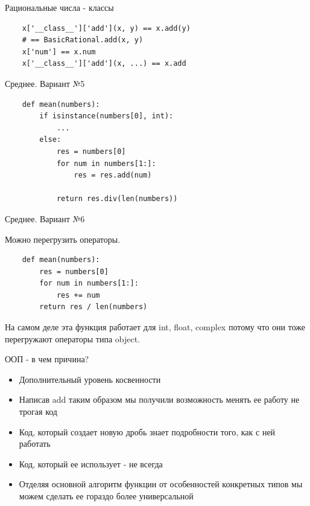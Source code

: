 \documentclass{article}
\begin{document}
\begin{center} Рациональные числа - классы \end{center}
\begin{lstlisting}
    x['__class__']['add'](x, y) == x.add(y) 
    # == BasicRational.add(x, y)
    x['num'] == x.num
    x['__class__']['add'](x, ...) == x.add
\end{lstlisting}
\newpage

\begin{center} Среднее. Вариант №5 \end{center}
\begin{lstlisting}
    def mean(numbers):
        if isinstance(numbers[0], int):
            ...
        else:
            res = numbers[0]
            for num in numbers[1:]:
                res = res.add(num)

            return res.div(len(numbers))
\end{lstlisting}
\newpage

\begin{center} Среднее. Вариант №6 \end{center}
Можно перегрузить операторы.
\begin{lstlisting}
    def mean(numbers):
        res = numbers[0]
        for num in numbers[1:]:
            res += num
        return res / len(numbers)
\end{lstlisting}
На самом деле эта функция работает для int, float, complex потому что
они тоже перегружают операторы типа object.
\newpage

\begin{center} ООП - в чем причина? \end{center}
\begin{itemize}
    \item Дополнительный уровень косвенности
    \item Написав add таким образом мы получили возможность 
            менять ее работу не трогая код
    \item Код, который создает новую дробь знает 
            подробности того, как с ней работать
    \item Код, который ее использует - не всегда
    \item Отделяя основной алгоритм функции от особенностей конкретных типов
          мы можем сделать ее гораздо более универсальной
\end{itemize}
\newpage
\end{document}
